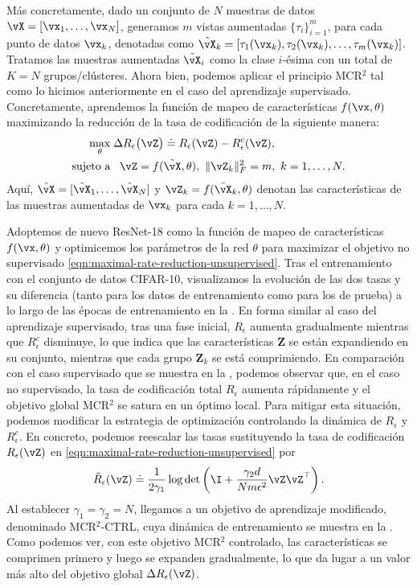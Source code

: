 \documentclass[../../book-main.tex]{subfiles}
\begin{document}
Más concretamente, dado un conjunto de $N$ muestras de datos $\vX =
[\vx_1,\dots,\vx_N]$, generamos $m$ vistas aumentadas
$\{\tau_i\}_{i=1}^m$, para cada punto de datos $\vx_k$, denotadas como
$\tilde{\vX}_{k} = [\tau_1(\vx_k), \tau_2(\vx_k), \dots, \tau_m(\vx_k)]$.
Tratamos las muestras aumentadas $\tilde{\vX}_{i}$ como la clase $i$-ésima
con un total de $K=N$ grupos/clústeres. Ahora bien, podemos aplicar el principio MCR$^2$
tal como lo hicimos anteriormente en el caso del aprendizaje supervisado.
Concretamente, aprendemos la función de mapeo de características $f(\vx,\theta)$
maximizando la reducción de la tasa de codificación de la siguiente manera:
\begin{equation}
    \begin{aligned}
        \max_{\theta } & \;  \Delta R_{\epsilon}\big(\vZ \big) \doteq
        R_{\epsilon}(\vZ) - R_{\epsilon}^c(\vZ ), \\
        \mbox{sujeto a} & \ \ \, \vZ = f(\tilde{\vX}, \theta),\  \|\vZ_k\|_F^2
        = m,\ k=1,\dots,N.
    \end{aligned}
    \label{eqn:maximal-rate-reduction-unsupervised}
\end{equation}
Aquí, $\tilde{\vX} = [\tilde{\vX}_1,\dots,\tilde{\vX}_N]$ y $\vZ_k =
f(\tilde{\vX}_k,\theta)$ denotan las características de las muestras aumentadas
de $\vx_k$ para cada $k=1,\dots,N$.

Adoptemos de nuevo ResNet-18 como la función de mapeo de características $f(\vx,\theta)$
y optimicemos los parámetros de la red $\theta$ para maximizar el
objetivo no supervisado \eqref{eqn:maximal-rate-reduction-unsupervised}.
Tras el entrenamiento con el conjunto de datos CIFAR-10, visualizamos la evolución de
las dos tasas y su diferencia (tanto para los datos de entrenamiento como para los de prueba)
a lo largo de las épocas de entrenamiento en la .
En forma similar al caso del aprendizaje supervisado, tras una fase inicial,
$R_\epsilon$ aumenta gradualmente mientras que $R^c_\epsilon$ disminuye,
lo que indica que las características $\bm Z$ se están expandiendo en su conjunto, mientras que cada
grupo $\bm Z_k$ se está comprimiendo. En comparación con el caso supervisado
que se muestra en la , podemos observar que, en el
caso no supervisado, la tasa de codificación total $R_\epsilon$ aumenta rápidamente
y el objetivo global MCR$^2$ se satura en un óptimo local. Para
mitigar esta situación, podemos modificar la estrategia de optimización controlando
la dinámica de $R_\epsilon$ y $R^c_\epsilon$. En concreto, podemos
reescalar las tasas sustituyendo la tasa de codificación $R_\epsilon(\vZ)$ en
\eqref{eqn:maximal-rate-reduction-unsupervised} por
$$\tilde{R}_\epsilon(\vZ) \doteq \frac{1}{2\gamma_1} \log \det
\left(\I + \frac{\gamma_2 d}{N m \epsilon^{2}}\vZ \vZ ^{\top}\right).$$
Al establecer $\gamma_1 = \gamma_2 = N$, llegamos a un
objetivo de aprendizaje modificado, denominado MCR$^2$-{\scriptsize CTRL}, cuya
dinámica de entrenamiento se muestra en la
. Como podemos ver, con este
objetivo MCR$^2$ controlado, las características se comprimen primero y luego
se expanden gradualmente, lo que da lugar a un valor más alto del
objetivo global $\Delta R_{\epsilon}(\vZ)$.
\end{document}
